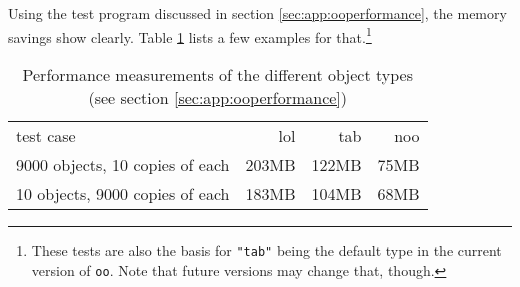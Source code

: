 Using the test program discussed in section \ref{sec:app:ooperformance}, the memory savings show clearly. Table \ref{tab:performance} lists a few examples for that.\footnote{These tests are also the basis for \texttt{"tab"} being the default type in the current version of \texttt{oo}. Note that future versions may change that, though.}

 \begin{table}[h]
 \caption{Performance measurements of the different object types (see section \ref{sec:app:ooperformance})}
 \begin{tabular}{l|rrr}
test case & lol & tab & noo\\
9000 objects, 10 copies of each & 203MB & 122MB & 75MB \\
10 objects, 9000 copies of each & 183MB & 104MB & 68MB \\
 \end{tabular}
 \label{tab:performance}
 \end{table}


